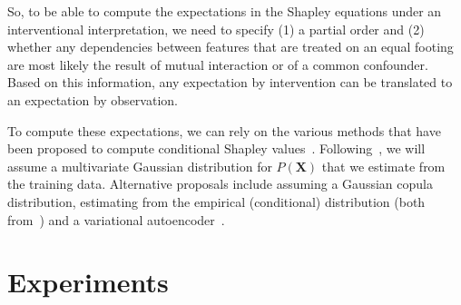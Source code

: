 \documentclass{article}
\newcommand{\vX}{\mathbf{X}}
\newcommand{\vx}{\mathbf{x}}
\newcommand{\dodo}{\mathit{do}}
\newcommand{\lvdo}[1]{\dodo(\vX_{#1} = \vx_{#1})}
\newcommand{\spa}{\mathop{\textit{\scriptsize pa}}}
\newcommand{\onder}[2]{{#1}_{\mbox{\scriptsize #2}}}
\newcommand{\isequal}{\hspace*{-2.5mm} & = & \hspace*{-2.5mm}}
\newcommand{\chaincomponents}{{\cal T}}
\newcommand{\comment}[1]{{\color{red} #1}}
\begin{document}
%
%
%
%
%
%

So, to be able to compute the expectations in the Shapley equations under an interventional interpretation, we need to specify (1) a partial order and (2) whether any dependencies between features that are treated on an equal footing are most likely the result of mutual interaction or of a common confounder. Based on this information, any expectation by intervention can be translated to an expectation by observation.

To compute these expectations, we can rely on the various methods that have been proposed to compute conditional Shapley values~\cite{aas2019explaining,frye2019asymmetric}. Following~\cite{aas2019explaining}, we will assume a multivariate Gaussian distribution for $P(\vX)$ that we estimate from the training data. Alternative proposals include assuming a Gaussian copula distribution, estimating from the empirical (conditional) distribution (both from~\cite{aas2019explaining}) and a variational autoencoder~\cite{frye2019asymmetric}.

\section{Experiments}
\end{document}
